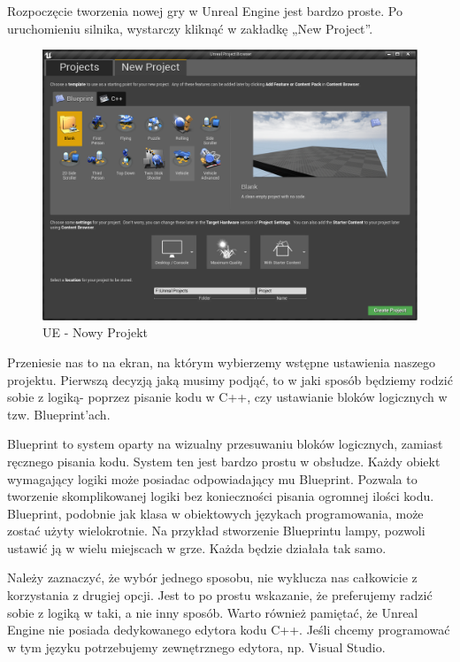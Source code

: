 \documentclass[brudnopis]{xmgr}
\begin{document}
Rozpoczęcie tworzenia nowej gry w Unreal Engine jest bardzo proste. Po uruchomieniu silnika, wystarczy kliknąć w zakładkę „New Project”.

\begin{figure}[!htb]
    \begin{center}
    \includegraphics[scale=0.35]{Screeny/New_project}
    \end{center}
    \caption{UE - Nowy Projekt}
\end{figure}

Przeniesie nas to na ekran, na którym wybierzemy wstępne ustawienia naszego projektu. Pierwszą decyzją jaką musimy podjąć, to w jaki sposób będziemy rodzić sobie z logiką- poprzez pisanie kodu w C++, czy ustawianie bloków logicznych w tzw. Blueprint’ach.

Blueprint to system oparty na wizualny przesuwaniu bloków logicznych, zamiast ręcznego pisania kodu. System ten jest bardzo prostu w obsłudze. Każdy obiekt wymagający logiki może posiadac odpowiadający mu Blueprint. Pozwala to tworzenie skomplikowanej logiki bez konieczności pisania ogromnej ilości kodu. Blueprint, podobnie jak klasa w obiektowych językach programowania, może zostać użyty wielokrotnie. Na przykład stworzenie Blueprintu lampy, pozwoli ustawić ją w wielu miejscach w grze. Każda będzie działała tak samo.

Należy zaznaczyć, że wybór jednego sposobu, nie wyklucza nas całkowicie z korzystania z drugiej opcji. Jest to po prostu wskazanie, że preferujemy radzić sobie z logiką w taki, a nie inny sposób.
Warto również pamiętać, że Unreal Engine nie posiada dedykowanego edytora kodu C++. Jeśli chcemy programować w tym języku potrzebujemy zewnętrznego edytora, np. Visual Studio.
\end{document}
